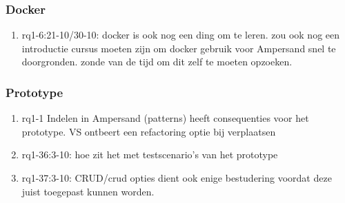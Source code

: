 \subsubsection{Docker}
\begin{comment}
plaats hier de afgehandelde items.
\end{comment}
\begin{enumerate}
    \item rq1-6:21-10/30-10: docker is ook nog een ding om te leren. zou ook nog een introductie cursus moeten zijn om docker gebruik voor Ampersand snel te doorgronden. zonde van de tijd om dit zelf te moeten opzoeken.

\end{enumerate}

\subsubsection{Prototype}
\begin{comment}
plaats hier de afgehandelde items.
\end{comment}
\begin{enumerate}
    \item rq1-1 Indelen in Ampersand (patterns) heeft consequenties voor het prototype. VS ontbeert een refactoring optie bij verplaatsen
    \item rq1-36:3-10: hoe zit het met testscenario's van het prototype
    \item rq1-37:3-10: CRUD/crud opties dient ook enige bestudering voordat deze juist toegepast kunnen worden.
\end{enumerate}

